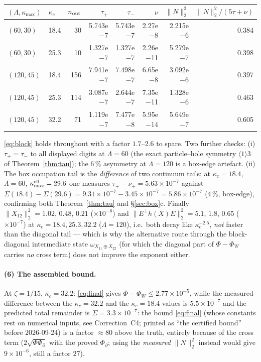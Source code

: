 \documentclass[11pt]{article}
\begin{document}
\begin{center}\small\begin{tabular}{ll r rrr rr}\toprule
$(\Lambda,\kappa_{\max})$ & $\kappa_c$ & $n_{\rm out}$ & $\tau_+$ & $\tau_-$ & $\nu$
& $\|N\|_2^2$ & $\|N\|_2^2/(5\tau+\nu)$\\\midrule
$(60,30)$  & 18.4 & 30  & 5.743e$-$7 & 5.743e$-$7 & 2.27e$-$8 & 2.215e$-$6 & 0.384\\
$(60,30)$  & 25.3 & 10  & 1.327e$-$7 & 1.327e$-$7 & 2.26e$-$11& 5.279e$-$7 & 0.398\\
$(120,45)$ & 18.4 & 156 & 7.941e$-$7 & 7.498e$-$7 & 6.65e$-$8 & 3.092e$-$6 & 0.397\\
$(120,45)$ & 25.3 & 114 & 3.087e$-$7 & 2.644e$-$7 & 7.35e$-$11& 1.328e$-$6 & 0.463\\
$(120,45)$ & 32.2 & 71  & 1.119e$-$7 & 7.477e$-$8 & 5.95e$-$14& 5.649e$-$7 & 0.605\\\bottomrule
\end{tabular}\end{center}
\eqref{eq:block} holds throughout with a factor $1.7$--$2.6$ to spare.  Two further checks:
(i) $\tau_+=\tau_-$ to all displayed digits at $\Lambda=60$ (the exact particle--hole symmetry
$\langle1\rangle3$ of Theorem~\ref{thm:tau}); the $6\,\%$ asymmetry at $\Lambda=120$ is a box-edge
artefact.  (ii) The box occupation tail is the \emph{difference} of two continuum tails: at
$\kappa_c=18.4$, $\Lambda=60$, $\kappa_{\max}^{\rm eff}=29.6$ one measures
$\tau_+-\nu_+=5.63\times10^{-7}$ against
$\Sigma(18.4)-\Sigma(29.6)=9.31\times10^{-7}-3.45\times10^{-7}=5.86\times10^{-7}$ ($4\,\%$, box-edge),
confirming both Theorem~\ref{thm:tau} and \S\ref{sec:box}c.
Finally $\|X_{12}\|_2^2=1.02,\,0.48,\,0.21$ ($\times10^{-6}$) and $\|E^\perp h(X)E\|_2^2
=5.1,\,1.8,\,0.65$ ($\times10^{-7}$) at $\kappa_c=18.4,25.3,32.2$ ($\Lambda=120$), i.e.\ both decay
like $\kappa_c^{-2.5}$, \emph{not} faster than the diagonal tail --- which is why the alternative
route through the block-diagonal intermediate state $\omega_{X_{11}\oplus X_{22}}$ (for which the
diagonal part of $\Phi-\Phi_W$ carries \emph{no} cross term) does not improve the exponent either.

\paragraph{(6) The assembled bound.}  At $\zeta=1/15$, $\kappa_c=32.2$: \eqref{eq:final} gives
$\Phi-\Phi_W\le2.77\times10^{-5}$, while the measured difference between the $\kappa_c=32.2$ and the
$\kappa_c=18.4$ values is $5.5\times10^{-7}$ and the predicted total remainder is
$\Sigma=3.3\times10^{-7}$: the bound \eqref{eq:final} (whose constants rest on numerical inputs, see Correction~C4; printed as ``the certified bound'' before 2026-09-24) is a factor $\approx80$ above the truth, entirely
because of the cross term ($2\sqrt{\Phi\Phi_\partial}$ with the proved $\Phi_\partial$; using the
\emph{measured} $\|N\|_2^2$ instead would give $9\times10^{-6}$, still a factor $27$).
\end{document}
